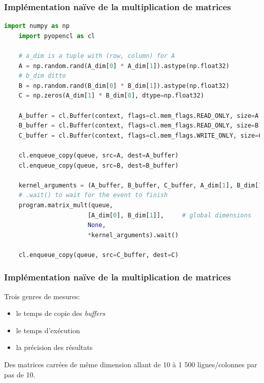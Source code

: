 \begin{frame}[fragile]
    \frametitle{Implémentation naïve de la multiplication de matrices}
    \begin{lstlisting}[language=python]
    import numpy as np
    import pyopencl as cl

    # a_dim is a tuple with (row, column) for A
    A = np.random.rand(A_dim[0] * A_dim[1]).astype(np.float32)   
    # b_dim ditto
    B = np.random.rand(B_dim[0] * B_dim[1]).astype(np.float32)   
    C = np.zeros(A_dim[1] * B_dim[0], dtype=np.float32)

    A_buffer = cl.Buffer(context, flags=cl.mem_flags.READ_ONLY, size=A.nbytes)
    B_buffer = cl.Buffer(context, flags=cl.mem_flags.READ_ONLY, size=B.nbytes)
    C_buffer = cl.Buffer(context, flags=cl.mem_flags.WRITE_ONLY, size=C.nbytes)

    cl.enqueue_copy(queue, src=A, dest=A_buffer)
    cl.enqueue_copy(queue, src=B, dest=B_buffer)

    kernel_arguments = (A_buffer, B_buffer, C_buffer, A_dim[1], B_dim[1])
    # .wait() to wait for the event to finish
    program.matrix_mult(queue, 
                       [A_dim[0], B_dim[1]],     # global dimensions
                       None, 
                       *kernel_arguments).wait()

    cl.enqueue_copy(queue, src=C_buffer, dest=C)
    \end{lstlisting}
\end{frame}

\begin{frame}
    \frametitle{Implémentation naïve de la multiplication de matrices}
    Trois genres de mesures:\pause{}
    \begin{itemize}
        \item le temps de copie des \textit{buffers}\pause{}
        \item le temps d'exécution\pause{}
        \item la précision des résultats\pause{}
    \end{itemize}\pause{}
    \vspace{20pt}
    Des matrices carrées de même dimension allant de 10 à 1 500 lignes/colonnes par pas de 10.
\end{frame}


